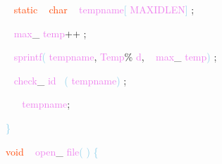 \documentclass[8, usernames, dvipsnames]{beamer}
\begin{document}
\begin{frame}
\textcolor{White}{\   }
\textcolor{OrangeRed}{static}
\textcolor{White}{\ }
\textcolor{OrangeRed}{char}
\textcolor{White}{\ }
\textcolor{Violet}{tempname}\textcolor{SkyBlue}{[}
\textcolor{Violet}{MAXIDLEN}\textcolor{SkyBlue}{]}
\textcolor{Sepia}{;}

 
 \textcolor{White}{\   }
\textcolor{Violet}{max}\textcolor{Sepia}{\_}
\textcolor{Violet}{temp}\textcolor{Apricot}{++}
\textcolor{Sepia}{;}

 \textcolor{White}{\   }
\textcolor{Violet}{sprintf}\textcolor{SkyBlue}{(}
\textcolor{Violet}{tempname}\textcolor{Sepia}{,}
\textcolor{Violet}{Temp}\textcolor{Apricot}{\%}
\textcolor{Violet}{d}\textcolor{Sepia}{,}
\textcolor{White}{\ }
\textcolor{Violet}{max}\textcolor{Sepia}{\_}
\textcolor{Violet}{temp}\textcolor{SkyBlue}{)}
\textcolor{Sepia}{;}

 
 \textcolor{White}{\   }
\textcolor{Violet}{check}\textcolor{Sepia}{\_}
\textcolor{Violet}{id}\textcolor{White}{\ }
\textcolor{SkyBlue}{(}
\textcolor{Violet}{tempname}\textcolor{SkyBlue}{)}
\textcolor{Sepia}{;}

 \textcolor{White}{\   }
\textcolor{OrangeRed}{	}
\textcolor{White}{\ }
\textcolor{Violet}{tempname}\textcolor{Sepia}{;}

 \textcolor{SkyBlue}{\} }

 
 \textcolor{OrangeRed}{void}
\textcolor{White}{\ }
\textcolor{Violet}{open}\textcolor{Sepia}{\_}
\textcolor{Violet}{file}\textcolor{SkyBlue}{(}
\textcolor{SkyBlue}{)}
\textcolor{SkyBlue}{\{ }

 \end{frame}
\end{document}
